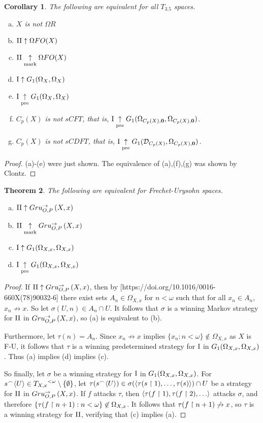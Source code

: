 \documentclass[11pt]{article}
\theoremstyle{plain}
\newtheorem{theorem}{Theorem}
\newtheorem{corollary}[theorem]{Corollary}
\theoremstyle{definition}
\theoremstyle{remark}
\theoremstyle{plain}
\theoremstyle{definition}
\theoremstyle{remark}
\begin{document}
\begin{corollary}
The following are equivalent for all \(T_{3.5}\) spaces.
\begin{enumerate}[a)]
\item \(X\) is not \(\Omega R\)
\item \(\mathrm{II}\uparrow \Omega FO(X)\)
\item \(\mathrm{II}\underset{\text{mark}}{\uparrow} \Omega FO(X)\)
\item \(\mathrm{I}\uparrow G_1(\Omega_X,\Omega_X)\)
\item \(\mathrm{I}\underset{\text{pre}}{\uparrow} G_1(\Omega_X,\Omega_X)\)
\item \(C_p(X)\) is not \(sCFT\), that is, 
  \(\mathrm{I}\underset{\text{pre}}{\uparrow} G_{1}(\Omega_{C_p(X),\mathbf 0},\Omega_{C_p(X),\mathbf 0})\).
\item \(C_p(X)\) is not \(sCDFT\), that is,
  \(\mathrm{I}\underset{\text{pre}}{\uparrow} G_{1}(\mathcal{D}_{C_p(X)},\Omega_{C_p(X),\mathbf 0})\).
\end{enumerate}
\end{corollary}
\begin{proof}
(a)-(e) were just shown.
The equivalence of (a),(f),(g) was shown by Clontz.
\end{proof}

\begin{theorem}
The following are equivalent for Frechet-Urysohn spaces.
\begin{enumerate}[a)]
\item \(\mathrm{II}\uparrow Gru_{O,P}^{\to}\left({X},{x}\right)\)
\item \(\mathrm{II}\underset{\text{mark}}{\uparrow}Gru_{O,P}^{\to}\left({X},{x}\right)\)
\item \(\mathrm{I}\uparrow G_{1}(\Omega_{X,x},\Omega_{X,x})\)
\item \(\mathrm{I}\underset{\text{pre}}{\uparrow}G_{1}(\Omega_{X,x},\Omega_{X,x})\) 
\end{enumerate}
\end{theorem}
\begin{proof}
If \(\mathrm{II}\uparrow Gru_{O,P}^{\to}\left({X},{x}\right)\), then by
[https://doi.org/10.1016/0016-660X(78)90032-6]
there exist sets \(A_n\in\Omega_{X,x}\) for \(n<\omega\) such
that for all \(x_n\in A_n\), \(x_n\not\to x\). 
So let \(\sigma(U,n)\in A_n\cap U\).
It follows that \(\sigma\) is a winning Markov strategy
for \(\mathrm{II}\) in \(Gru_{O,P}^{\to}\left({X},{x}\right)\), so (a)
is equivalent to (b).

Furthermore, let \(\tau(n)=A_n\). Since
\(x_n\not\to x\) implies \(\{x_n:n<\omega\}\not\in\Omega_{X,x}\)
as \(X\) is F-U, it follows that
\(\tau\) is a winning predetermined strategy for \(\mathrm{I}\)
in \(G_{1}(\Omega_{X,x},\Omega_{X,x})\).
Thus (a) implies (d) implies (c).

So finally, let \(\sigma\) be a winning strategy for \(\mathrm{I}\) in
\(G_{1}(\Omega_{X,x},\Omega_{X,x})\). 
For \(s{^\frown}\langle U\rangle\in {T_{X,x}}^{<\omega}\setminus\{\emptyset\}\),
let \(\tau(s{^\frown}\langle U\rangle)\in\sigma(\langle\tau(s\restriction 1),\dots,\tau(s)\rangle)\cap U\)
be a strategy for \(\mathrm{II}\) in \(Gru_{O,P}^{\to}\left({X},{x}\right)\).
If \(f\) attacks \(\tau\), then
\(\<\tau(f\rest 1),\tau(f\rest 2),\dots\>\) attacks \(\sigma\),
and therefore \(\{\tau(f\restriction n+1):n<\omega\}\not\in\Omega_{X,x}\).
It follows that \(\tau(f\restriction n+1)\not\to x\), so \(\tau\) is a
winning strategy for \(\mathrm{II}\), verifying that (c) implies (a).
\end{proof}
\end{document}
